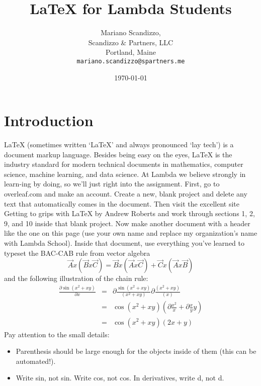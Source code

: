 \documentclass{article}
\begin{document}
\title{ \LaTeX{} for Lambda Students}
\author{Mariano Scandizzo,\\
	Scandizzo \& Partners, LLC\\
	Portland, Maine\\
	\texttt{mariano.scandizzo@spartners.me}}
\date{\today}
\maketitle
\section{Introduction}
\justifying
\LaTeX{} (sometimes written `LaTeX' and always pronounced `lay tech')
 is a document markup language. Besides being easy on the eyes, 
 \LaTeX{} is the industry standard for modern technical documents in 
 mathematics, computer science, machine learning, and data science.
 At Lambda we believe strongly in learn-ing by doing, so we'll just 
 right into the assignment. First, go to overleaf.com and make an account.
 Create a new, blank project and delete any text that automatically comes
 in the document. Then visit the excellent site Getting to grips with \LaTeX{}
 by Andrew Roberts and work through sections 1, 2, 9, and 10 inside that blank
 project. Now make another document with a header like the one on this page
 (use your own name and replace my organization's name with Lambda School).
 Inside that document, use everything you've learned to typeset the BAC-CAB
 rule from vector algebra
\begin{equation}
	\overrightarrow{A} x \left(\overrightarrow{B} x \overrightarrow{C} \right) = \overrightarrow{B} x \left(\overrightarrow{A} x \overrightarrow{C} \right) + \overrightarrow{C} x \left(\overrightarrow{A} x \overrightarrow{B} \right)
\end{equation}
and the following illustration of the chain rule:
 \begin{eqnarray*}
       \frac{\partial \sin \left(x^2 + xy \right)}{\partial x} & = & {\partial \frac{\sin \left(x^2 + xy \right)}{\left(x^2 + xy \right)}} {\partial \frac{\left(x^2 + xy \right)}{\left(x \right)}} \\
       & = & \cos \left(x^2 + xy \right) \left(\partial \frac{x^2}{x} + \partial \frac{x}{y} y \right) \\
       & = & \cos \left(x^2 + xy \right) \left(2x + y \right) 
 \end{eqnarray*}
Pay attention to the small details:
\begin{itemize}
	\item Parenthesis should be large enough for the objects inside of them (this can be automated!).
	\item Write sin, not sin. Write cos, not cos. In derivatives, write d, not d.
\end{itemize}
\end{document}
